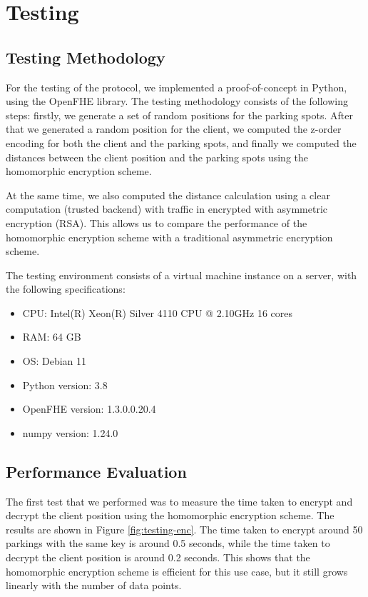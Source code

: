 
\chapter{Testing}
\section{Testing Methodology}

For the testing of the protocol, we implemented a proof-of-concept in Python, using the OpenFHE library\cite{openFHE}. The testing methodology consists of the following steps: firstly, we generate a set of random positions for the parking spots. After that we generated a random position for the client, we computed the z-order encoding for both the client and the parking spots, and finally we computed the distances between the client position and the parking spots using the homomorphic encryption scheme.

At the same time, we also computed the distance calculation using a clear computation (trusted backend) with traffic in encrypted with asymmetric encryption (RSA). This allows us to compare the performance of the homomorphic encryption scheme with a traditional asymmetric encryption scheme.

The testing environment consists of a virtual machine instance on a server, with the following specifications:
\begin{itemize}
    \item CPU: Intel(R) Xeon(R) Silver 4110 CPU @ 2.10GHz 16 cores
    \item RAM: 64 GB
    \item OS: Debian 11
    \item Python version: 3.8
    \item OpenFHE version: 1.3.0.0.20.4
    \item numpy version: 1.24.0
\end{itemize}

\section{Performance Evaluation}

The first test that we performed was to measure the time taken to encrypt and decrypt the client position using the homomorphic encryption scheme. The results are shown in Figure \ref{fig:testing-enc}. The time taken to encrypt around 50 parkings with the same key is around 0.5 seconds, while the time taken to decrypt the client position is around 0.2 seconds. This shows that the homomorphic encryption scheme is efficient for this use case, but it still grows linearly with the number of data points.

